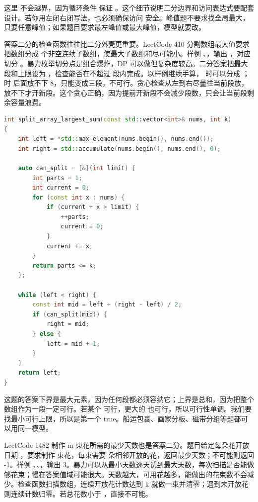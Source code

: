这里  不会越界，因为循环条件  保证 。这个细节说明二分边界和访问表达式要配套设计。若你用左闭右闭写法，也必须确保访问  安全。峰值题不要求找全局最大，只要任意峰值；如果题目要求最左峰值或最大峰值，模型就要改。

答案二分的检查函数往往比二分外壳更重要。LeetCode 410 分割数组最大值要求把数组分成  个非空连续子数组，使最大子数组和尽可能小。样例 、，输出 ，对应切分 \code{[7,2,5] | [10,8]}。暴力枚举切分点是组合爆炸，DP 可以做但复杂度较高。二分答案把最大段和上限设为 ，检查能否在不超过  段内完成。以样例继续手算， 时可以分成 \code{[7,2,5] | [10,8]}； 时  后面放不下 8，只能变成三段，不可行。贪心检查从左到右尽量往当前段放，放不下才开新段。这个贪心正确，因为提前开新段不会减少段数，只会让当前段剩余容量浪费。

\begin{lstlisting}[language=C++,caption={LeetCode 410 分割数组最大值：二分最大段和}]
int split_array_largest_sum(const std::vector<int>& nums, int k)
{
    int left = *std::max_element(nums.begin(), nums.end());
    int right = std::accumulate(nums.begin(), nums.end(), 0);

    auto can_split = [&](int limit) {
        int parts = 1;
        int current = 0;
        for (const int x : nums) {
            if (current + x > limit) {
                ++parts;
                current = 0;
            }
            current += x;
        }
        return parts <= k;
    };

    while (left < right) {
        const int mid = left + (right - left) / 2;
        if (can_split(mid)) {
            right = mid;
        } else {
            left = mid + 1;
        }
    }
    return left;
}
\end{lstlisting}

这题的答案下界是最大元素，因为任何段都必须容纳它；上界是总和，因为把整个数组作为一段一定可行。若某个  可行，更大的  也可行，所以可行性单调。我们要找最小可行上限，所以是第一个 true。船运包裹、画家分板、磁带分组等题都可以用同一模型。

LeetCode 1482 制作 m 束花所需的最少天数也是答案二分。题目给定每朵花开放日期 ，要求制作  束花，每束需要  朵相邻开放的花，返回最少天数；不可能则返回 -1。样例 、、，输出 3。暴力可以从最小天数逐天试到最大天数，每次扫描是否能做够花束；慢在答案值域可能很大。天数越大，可用花越多，能做出的花束数不会减少。检查函数扫描数组，连续开放花计数达到 k 就做一束并清零；遇到未开放花则连续计数归零。若总花数小于 ，直接不可能。

